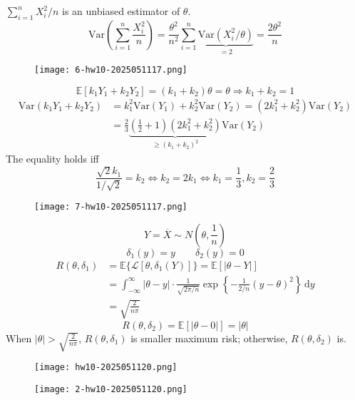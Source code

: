 $\sum_{i=1}^{n}X_i^2/n$ is an unbiased estimator of $\theta$.
\[
\mathrm{Var}\left( \sum_{i=1}^{n} \frac{X_i^2}{n} \right)=\frac{\theta^{2}}{n^2}\sum_{i=1}^{n}\underbrace{ \mathrm{Var}(X_i^2/\theta) }_{ =2 }=\frac{2\theta^{2}}{n}
\]
\begin{exercise}
\begin{figure}[H]
\centering
\texttt{[image: 6-hw10-2025051117.png]}
\label{}
\end{figure}
\end{exercise}
\[
\mathbb{E}[k_1Y_1+k_2Y_2]=(k_1+k_2)\theta=\theta\Rightarrow k_1+k_2=1
\]
\[
\begin{aligned}
\mathrm{Var}(k_1Y_1+k_2Y_2) & =k_1^2\mathrm{Var}(Y_1)+k_2^2\mathrm{Var}(Y_2)=(2k_1^2+k_2^2)\mathrm{Var}(Y_2) \\
 & =\frac{2}{3}\underbrace{ \left( \frac{1}{2}+1 \right)(2k_1^2+k_2^2) }_{ \geq (k_1+k_2)^2 }\mathrm{Var}(Y_2)
\end{aligned}
\]
The equality holds iff
\[
\frac{\sqrt{ 2 }k_1}{1/\sqrt{ 2 }}=k_2\iff k_2=2k_1 \iff k_1=\frac{1}{3},k_2=\frac{2}{3}
\]
\begin{exercise}
\begin{figure}[H]
\centering
\texttt{[image: 7-hw10-2025051117.png]}
\label{}
\end{figure}
\end{exercise}
\[
Y=\overline{X}\sim N\left( \theta,\frac{1}{n} \right)
\]
\[
\delta_1(y)=y\qquad \delta_2(y)=0
\]
\[
\begin{aligned}
R(\theta,\delta_1) & =\mathbb{E}\{ \mathcal{L}[\theta,\delta_1(Y)] \}=\mathbb{E}[\lvert \theta-Y \rvert ] \\
 & =\int_{-\infty}^{\infty} \lvert \theta-y \rvert \cdot\frac{1}{\sqrt{ 2\pi/n  }}\exp \left\{ - \frac{1}{2/n }(y-\theta)^2  \right\} \, \mathrm{d}y \\
 & =\sqrt{ \frac{2}{n\pi} }
\end{aligned}
\]
\[
R(\theta,\delta_2)  =\mathbb{E}[\lvert \theta-0 \rvert ]=\lvert \theta \rvert 
\]
When $\lvert \theta \rvert>\sqrt{ \frac{2}{n\pi} }$, $R(\theta,\delta_1)$ is smaller maximum risk; otherwise, $R(\theta,\delta_2)$ is.

\begin{figure}[H]
\centering
\texttt{[image: hw10-2025051120.png]}
\label{}
\end{figure}
\begin{figure}[H]
\centering
\texttt{[image: 2-hw10-2025051120.png]}
\label{}
\end{figure}

